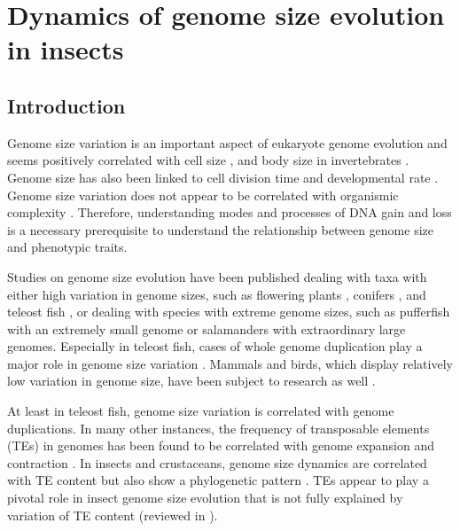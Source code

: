 
\chapter{Dynamics of genome size evolution in insects}
\label{cha:dynamics}

\section{Introduction}

Genome size variation is an important aspect of eukaryote genome
evolution \citep{Gregory2005,Petrov2001} and seems positively correlated
with cell size \citep{Dufresne2011}, and body size in invertebrates
\citep{Gregory2008}. Genome size has also been linked to cell division
time \citep{Bennett1977} and developmental rate \citep{White2000}.
Genome size variation does not appear to be correlated with organismic
complexity \citep{Gregory2007}. Therefore, understanding modes and
processes of DNA gain and loss is a necessary prerequisite to understand
the relationship between genome size and phenotypic traits.

Studies on genome size evolution have been published dealing with taxa
with either high variation in genome sizes, such as flowering plants
\citep{Bennetzen2005,Piegu2006,Vitte2007,Kelly2015}, conifers
\citep{Nystedt2013} \cite{Nystedt2013}, and teleost fish
\citep{Blass2012}, or dealing with species with extreme genome sizes,
such as pufferfish \citep{Neafsey2003} with an extremely small genome or
salamanders \citep{Sun2012} with extraordinary large genomes. Especially
in teleost fish, cases of whole genome duplication play a major role in
genome size variation \citep{Sato2010,Marburger2018}. Mammals and birds,
which display relatively low variation in genome size, have been subject
to research as well \citep{Kapusta2017a}.

At least in teleost fish, genome size variation is correlated with
genome duplications. In many other instances, the frequency of
transposable elements (TEs) in genomes has been found to be correlated
with genome expansion and contraction \citep{Sotero-Caio2017}. In insects
and crustaceans, genome size dynamics are correlated with TE content but
also show a phylogenetic pattern \citep{Alfsnes2017,Petrov1996,Petrov2000}. TEs appear to play
a pivotal role in insect genome size evolution that is not fully
explained by variation of TE content (reviewed in \citet{Maumus2015}).

